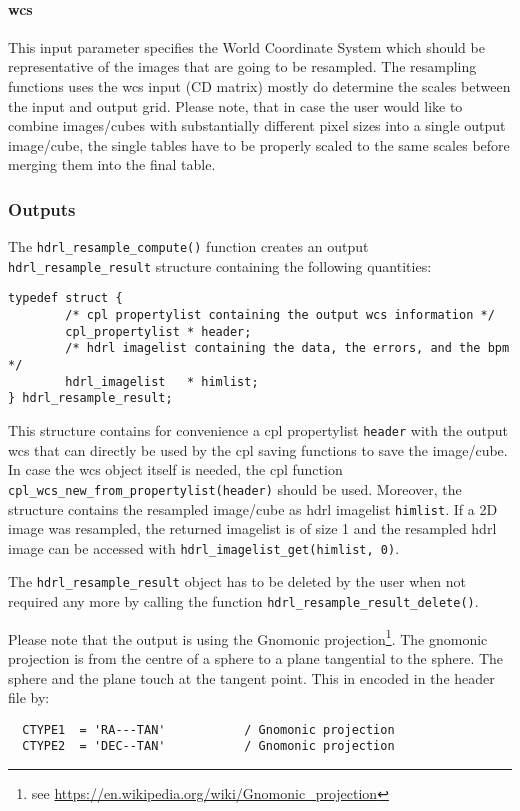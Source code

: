 \paragraph*{wcs}
This input parameter specifies the World Coordinate System which should be
representative of the images that are going to be resampled. The resampling
functions uses the wcs input (CD matrix) mostly do determine the scales between
the input and output grid. Please note, that in case the user would like to
combine images/cubes with substantially different pixel sizes into a single
output image/cube, the single tables have to be properly scaled to the same
scales before merging them into the final table.


\subsubsection{Outputs}
\label{sec:algorithms:resampling:outputs}

The \verb+hdrl_resample_compute()+ function creates an output
\verb+hdrl_resample_result+ structure containing the following quantities:

\begin{lstlisting}
typedef struct {
        /* cpl propertylist containing the output wcs information */
        cpl_propertylist * header;
        /* hdrl imagelist containing the data, the errors, and the bpm */
        hdrl_imagelist   * himlist;
} hdrl_resample_result;
\end{lstlisting}

This structure contains for convenience a cpl propertylist \verb+header+ with
the output wcs that can directly be used by the cpl saving functions to save the
image/cube. In case the wcs object itself is needed, the cpl function
\verb+cpl_wcs_new_from_propertylist(header)+ should be used. Moreover, the
structure contains the resampled image/cube as hdrl imagelist \verb+himlist+. If
a 2D image was resampled, the returned imagelist is of size 1 and the resampled
hdrl image can be accessed with \verb+hdrl_imagelist_get(himlist, 0)+.

The \verb+hdrl_resample_result+ object has to be deleted by the user
when not required any more by calling the function
\verb+hdrl_resample_result_delete()+.

Please note that the output is using the Gnomonic projection\footnote{see
  \url{https://en.wikipedia.org/wiki/Gnomonic_projection}}. The gnomonic
projection is from the centre of a sphere to a plane tangential to the
sphere. The sphere and the plane touch at the tangent point. This in encoded in
the header file by:
\begin{lstlisting}
  CTYPE1  = 'RA---TAN'           / Gnomonic projection
  CTYPE2  = 'DEC--TAN'           / Gnomonic projection
\end{lstlisting}

